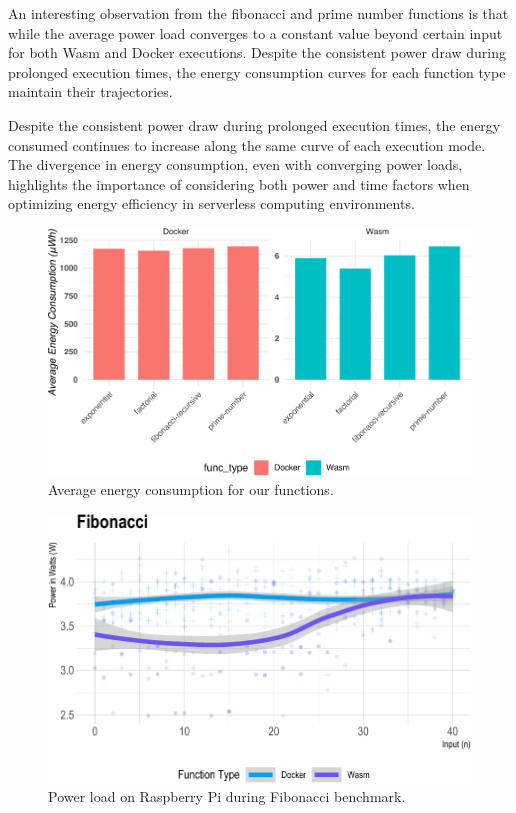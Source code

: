 \documentclass[
  table]{report}
\begin{document}
An interesting observation from the fibonacci and prime number functions
is that while the average power load converges to a constant value
beyond certain input for both \ac{Wasm} and Docker executions. Despite
the consistent power draw during prolonged execution times, the energy
consumption curves for each function type maintain their trajectories.

Despite the consistent power draw during prolonged execution times, the
energy consumed continues to increase along the same curve of each
execution mode. The divergence in energy consumption, even with
converging power loads, highlights the importance of considering both
power and time factors when optimizing energy efficiency in serverless
computing environments.

\begin{figure}[H]

{\centering \includegraphics{thesis_files/figure-latex/avg-energy-consumption-rpi-1} 

}

\caption{Average energy consumption for our functions.}\label{fig:avg-energy-consumption-rpi}
\end{figure}

\begin{figure}[H]

{\centering \includegraphics{thesis_files/figure-latex/fib-power-1} 

}

\caption{Power load on Raspberry Pi during Fibonacci benchmark.}\label{fig:fib-power}
\end{figure}
\end{document}
